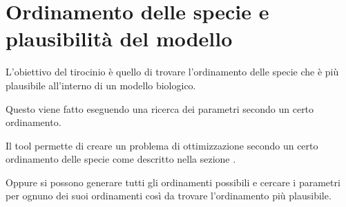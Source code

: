 \section{Ordinamento delle specie e plausibilità del modello}

L'obiettivo del tirocinio è quello di trovare l'ordinamento delle specie che è più plausibile
all'interno di un modello biologico.

Questo viene fatto eseguendo una ricerca dei parametri secondo un certo ordinamento.


Il tool permette di creare un problema di ottimizzazione secondo un certo ordinamento delle specie come descritto nella sezione %
.

Oppure si possono generare tutti gli ordinamenti possibili e cercare i parametri
per ognuno dei suoi ordinamenti così da trovare l'ordinamento più plausibile.